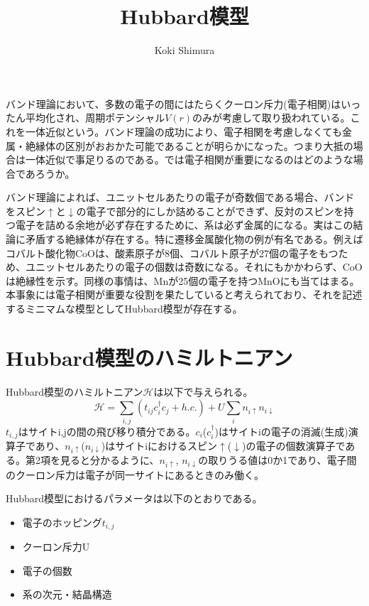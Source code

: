 \documentclass[12pt]{jarticle}
\begin{document}
\title{Hubbard模型}
\author{Koki Shimura}
\maketitle

バンド理論において、多数の電子の間にはたらくクーロン斥力(電子相関)はいったん平均化され、周期ポテンシャル$V(r)$のみが考慮して取り扱われている。これを一体近似という。バンド理論の成功により、電子相関を考慮しなくても金属・絶縁体の区別がおおかた可能であることが明らかになった。つまり大抵の場合は一体近似で事足りるのである。では電子相関が重要になるのはどのような場合であろうか。

バンド理論によれば、ユニットセルあたりの電子が奇数個である場合、バンドをスピン$\uparrow$と$\downarrow$の電子で部分的にしか詰めることができず、反対のスピンを持つ電子を詰める余地が必ず存在するために、系は必ず金属的になる。実はこの結論に矛盾する絶縁体が存在する。特に遷移金属酸化物の例が有名である。例えばコバルト酸化物CoOは、酸素原子が8個、コバルト原子が27個の電子をもつため、ユニットセルあたりの電子の個数は奇数になる。それにもかかわらず、CoOは絶縁性を示す。同様の事情は、Mnが25個の電子を持つMnOにも当てはまる。本事象には電子相関が重要な役割を果たしていると考えられており、それを記述するミニマムな模型としてHubbard模型が存在する。

\section{Hubbard模型のハミルトニアン}
Hubbard模型のハミルトニアン$\mathcal{H}$は以下で与えられる。
\begin{equation}
  \mathcal{H} = \sum_{i,j} (t_{ij} c_{i}^\dagger c_{j} + h.c.) + U\sum_{i}n_{i\uparrow}n_{i\downarrow}
  \label{Hubbard}
\end{equation}
$t_{i,j}$はサイトi,jの間の飛び移り積分である。$c_{i}$($c_{i}^{\dagger}$)はサイトiの電子の消滅(生成)演算子であり、$n_{i\uparrow}$($n_{i\downarrow}$)はサイトiにおけるスピン$\uparrow$($\downarrow$)の電子の個数演算子である。第2項を見ると分かるように、$n_{i\uparrow}$, $n_{i\downarrow}$の取りうる値は0か1であり、電子間のクーロン斥力は電子が同一サイトにあるときのみ働く。

Hubbard模型におけるパラメータは以下のとおりである。
\begin{itemize}
  \item 電子のホッピング$t_{i,j}$
  \item クーロン斥力U
  \item 電子の個数
  \item 系の次元・結晶構造
\end{itemize}
\end{document}
